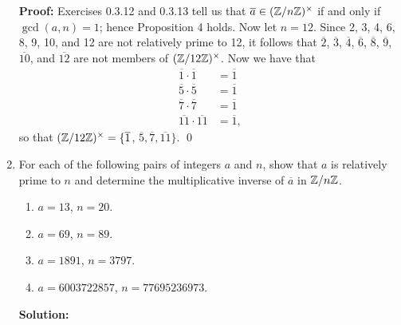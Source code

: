 \begin{enumerate}
      \textbf{Proof:} Exercises 0.3.12 and 0.3.13 tell us that
      $\overline{a} \in (\mathbb{Z}/n\mathbb{Z})^\times$ if and only if $\gcd(a, n) = 1$; hence
      Proposition 4 holds. Now let $n = 12$. Since 2, 3, 4, 6, 8, 9, 10, and
      12 are not relatively prime to 12, it follows that $\overline{2}$,
      $\overline{3}$, $\overline{4}$, $\overline{6}$, $\overline{8}$,
      $\overline{9}$, $\overline{10}$, and $\overline{12}$ are not members of
      $(\mathbb{Z}/12\mathbb{Z})^\times$. Now we have that
      \begin{align*}
         \overline{1} \cdot \overline{1} &= \overline{1} \\
         \overline{5} \cdot \overline{5} &= \overline{1} \\
         \overline{7} \cdot \overline{7} &= \overline{1} \\
         \overline{11} \cdot \overline{11} &= \overline{1},
      \end{align*}
      so that $(\mathbb{Z}/12\mathbb{Z})^\times = \{\overline{1}$, $\overline{5},
      \overline{7}, \overline{11}\}$. \qed
   \item[0.3.15]  For each of the following pairs of integers $a$ and $n$, show
                  that $a$ is relatively prime to $n$ and determine the
                  multiplicative inverse of $\overline{a}$ in $\mathbb{Z}/n\mathbb{Z}$.
                  \begin{enumerate}
                     \item $a = 13$, $n = 20$.
                     \item $a = 69$, $n = 89$.
                     \item $a = 1891$, $n = 3797$.
                     \item $a = 6003722857$, $n = 77695236973$.
                  \end{enumerate}

      \textbf{Solution:}


\end{enumerate}

